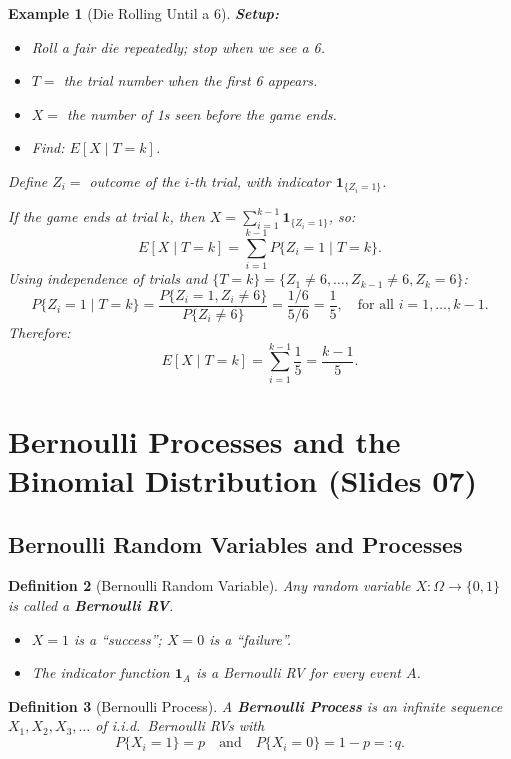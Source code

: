 \documentclass[12pt]{article}
\theoremstyle{definition_style}
\newtheorem{defn}{Definition}[section]
\newtheorem{example}[defn]{Example}
\begin{document}
\begin{example}[Die Rolling Until a 6]
\textbf{Setup:}
\begin{itemize}
    \item Roll a fair die repeatedly; stop when we see a 6.
    \item $T = $ the trial number when the first 6 appears.
    \item $X = $ the number of 1s seen before the game ends.
    \item Find: $E[X \mid T = k]$.
\end{itemize}
Define $Z_i = $ outcome of the $i$-th trial, with indicator $\mathbf{1}_{\{Z_i = 1\}}$.

If the game ends at trial $k$, then $X = \sum_{i=1}^{k-1} \mathbf{1}_{\{Z_i = 1\}}$, so:
\[
    E[X \mid T = k] = \sum_{i=1}^{k-1} P\{Z_i = 1 \mid T = k\}.
\]
Using independence of trials and $\{T = k\} = \{Z_1 \ne 6, \ldots, Z_{k-1} \ne 6, Z_k = 6\}$:
\[
    P\{Z_i = 1 \mid T = k\} = \frac{P\{Z_i = 1, Z_i \ne 6\}}{P\{Z_i \ne 6\}} = \frac{1/6}{5/6} = \frac{1}{5}, \quad \text{for all } i = 1, \ldots, k-1.
\]
Therefore:
\[
    E[X \mid T = k] = \sum_{i=1}^{k-1} \frac{1}{5} = \frac{k-1}{5}.
\]
\end{example}

\newpage
\section{Bernoulli Processes and the Binomial Distribution (Slides 07)}

\subsection{Bernoulli Random Variables and Processes}

\begin{defn}[Bernoulli Random Variable]
Any random variable $X: \Omega \to \{0, 1\}$ is called a \textbf{Bernoulli RV}.
\begin{itemize}
    \item $X = 1$ is a ``success''; $X = 0$ is a ``failure''.
    \item The indicator function $\mathbf{1}_A$ is a Bernoulli RV for every event $A$.
\end{itemize}
\end{defn}

\begin{defn}[Bernoulli Process]
A \textbf{Bernoulli Process} is an infinite sequence $X_1, X_2, X_3, \ldots$ of i.i.d.\ Bernoulli RVs with
\[
    P\{X_i = 1\} = p \quad \text{and} \quad P\{X_i = 0\} = 1 - p =: q.
\]
\end{defn}
\end{document}
